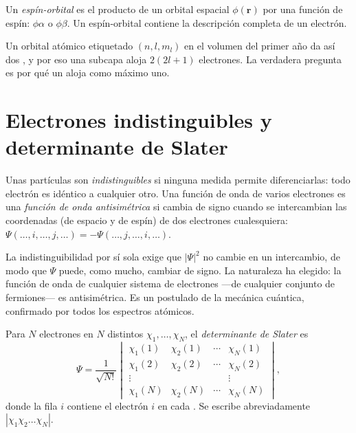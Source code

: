 \begin{definition}\label{def:b3:many-electron-atoms:spin-orbital}
Un \emph{espín-orbital} es el producto de un orbital espacial
$\phi(\mathbf r)$ por una función de espín: $\phi\alpha$ o $\phi\beta$. Un
espín-orbital contiene la descripción completa de un electrón.
\end{definition}

Un orbital atómico etiquetado $(n, l, m_l)$ en el volumen del primer año da así dos
, y por eso una subcapa aloja $2(2l+1)$ electrones. La verdadera
pregunta es por qué un  aloja como máximo uno.

\section{Electrones indistinguibles y determinante de Slater}

\begin{definition}\label{def:b3:many-electron-atoms:indistinguishable}
Unas partículas son \emph{indistinguibles} si
ninguna medida permite diferenciarlas: todo electrón es idéntico a cualquier
otro. Una función de onda de varios electrones es una \emph{función de onda
antisimétrica} si cambia de signo cuando se
intercambian las coordenadas (de espacio y de espín) de dos electrones cualesquiera:
$\Psi(\dots,i,\dots,j,\dots) = -\Psi(\dots,j,\dots,i,\dots)$.
\end{definition}

La indistinguibilidad por sí sola exige que $|\Psi|^2$ no cambie en un
intercambio, de modo que $\Psi$ puede, como mucho, cambiar de signo. La naturaleza ha elegido: la
función de onda de cualquier sistema de electrones ---de cualquier conjunto de fermiones--- es
antisimétrica. Es un postulado de la mecánica cuántica, confirmado por todos los
espectros atómicos.

\begin{definition}\label{def:b3:many-electron-atoms:slater}
Para $N$ electrones en $N$  distintos $\chi_1, \dots, \chi_N$, el
\emph{determinante de Slater} es
\[
\Psi = \frac{1}{\sqrt{N!}}\begin{vmatrix}
\chi_1(1) & \chi_2(1) & \cdots & \chi_N(1)\\
\chi_1(2) & \chi_2(2) & \cdots & \chi_N(2)\\
\vdots & & & \vdots\\
\chi_1(N) & \chi_2(N) & \cdots & \chi_N(N)
\end{vmatrix},
\]
donde la fila $i$ contiene el electrón $i$ en cada . Se escribe abreviadamente
$|\chi_1\chi_2\dots\chi_N|$.
\end{definition}


